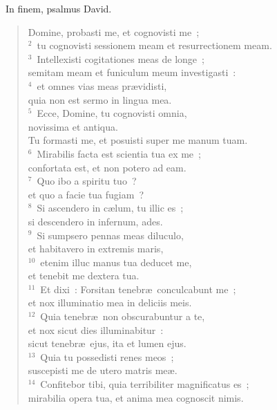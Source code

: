 ~\lettrine[lines=10,image=true,loversize=0.05,lraise=-0.03]{I}{}n finem, psalmus David. \begin{flushleft}\begin{verse}\vspace{6pt}Domine, probasti me, et cognovisti me~;\\
${}^{2}$~tu cognovisti sessionem meam et resurrectionem meam.\\
${}^{3}$~Intellexisti cogitationes meas de longe~;\\ semitam meam et funiculum meum investigasti~:\\
${}^{4}$~et omnes vias meas pr\ae vidisti,\\ quia non est sermo in lingua mea.\\
${}^{5}$~Ecce, Domine, tu cognovisti omnia,\\ novissima et antiqua.\\ Tu formasti me, et posuisti super me manum tuam.\\
${}^{6}$~Mirabilis facta est scientia tua ex me~;\\ confortata est, et non potero ad eam.\\
${}^{7}$~Quo ibo a spiritu tuo~?\\ et quo a facie tua fugiam~?\\
${}^{8}$~Si ascendero in c\ae lum, tu illic es~;\\ si descendero in infernum, ades.\\
${}^{9}$~Si sumpsero pennas meas diluculo,\\ et habitavero in extremis maris,\\
${}^{10}$~etenim illuc manus tua deducet me,\\ et tenebit me dextera tua.\\
${}^{11}$~Et dixi~: Forsitan tenebr\ae\ conculcabunt me~;\\ et nox illuminatio mea in deliciis meis.\\
${}^{12}$~Quia tenebr\ae\ non obscurabuntur a te,\\ et nox sicut dies illuminabitur~:\\ sicut tenebr\ae\ ejus, ita et lumen ejus.\\
${}^{13}$~Quia tu possedisti renes meos~;\\ suscepisti me de utero matris me\ae .\\
${}^{14}$~Confitebor tibi, quia terribiliter magnificatus es~;\\ mirabilia opera tua, et anima mea cognoscit nimis.\\

\end{verse}
\end{flushleft}
